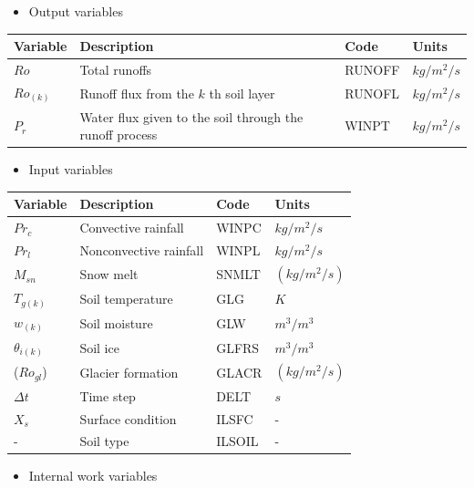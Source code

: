 \begin{itemize}
\tightlist
\item
  Output variables
\end{itemize}

\begin{longtable}[]{@{}llll@{}}
\toprule
Variable & Description & Code & Units \\
\midrule
\endhead
\(Ro\) & Total runoffs & RUNOFF & \(kg/m^2/s\) \\
\(Ro_{(k)}\) & Runoff flux from the \(k\) th soil layer & RUNOFL & \(kg/m^2/s\) \\
\(P_r\) & Water flux given to the soil through the runoff process & WINPT & \(kg/m^2/s\) \\
\bottomrule
\end{longtable}

\begin{itemize}
\tightlist
\item
  Input variables
\end{itemize}

\begin{longtable}[]{@{}llll@{}}
\toprule
Variable & Description & Code & Units \\
\midrule
\endhead
\(Pr_c\) & Convective rainfall & WINPC & \(kg/m^2/s\) \\
\(Pr_l\) & Nonconvective rainfall & WINPL & \(kg/m^2/s\) \\
\(M_{sn}\) & Snow melt & SNMLT & \((kg/m^2/s)\) \\
\(T_{g(k)}\) & Soil temperature & GLG & \(K\) \\
\(w_{(k)}\) & Soil moisture & GLW & \(m^3/m^3\) \\
\(\theta_{i(k)}\) & Soil ice & GLFRS & \(m^3/m^3\) \\
(\(Ro_{gl}\)) & Glacier formation & GLACR & \((kg/m^2/s)\) \\
\(\Delta t\) & Time step & DELT & \(s\) \\
\(X_s\) & Surface condition & ILSFC & - \\
- & Soil type & ILSOIL & - \\
\bottomrule
\end{longtable}

\begin{itemize}
\tightlist
\item
  Internal work variables
\end{itemize}

